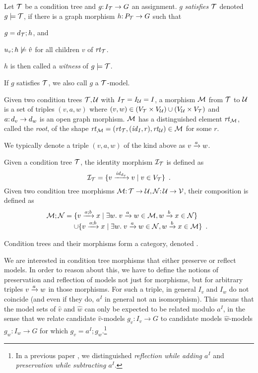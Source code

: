\begin{definition}[satisfaction]\label{def:satisfaction}
Let ${\mathcal{T}}$ be a condition tree and $g{:}\, I_{\mathcal{T}}\rightarrow G$ an assignment. $g$ \emph{satisfies ${\mathcal{T}}$} denoted $g\models {\mathcal{T}}$, if there is a graph morphism $h{:}\, P_{\mathcal{T}}\rightarrow G$ such that
\begin{inumerate}
\item $g=d_{\mathcal{T}};h$, and 
\item $u_v;h\not\models \hat v$ for all children $v$ of $\mathit{rt}_{{\mathcal{T}}}$.
\end{inumerate}
$h$ is then called a \emph{witness} of $g\models {\mathcal{T}}$.
\end{definition}
%
If $g$ satisfies ${\mathcal{T}}$, we also call $g$ a ${\mathcal{T}}$-model.


\begin{definition}[morphism]
Given two condition trees ${\mathcal{T}},{\mathcal{U}}$ with $I_{\mathcal{T}}=I_{\mathcal{U}}=I$, a morphism ${\mathcal{M}}$ from ${\mathcal{T}}$ to ${\mathcal{U}}$ is a set of triples $(v,a,w)$ where $(v,w)\in (V_{\mathcal{T}}\times V_{\mathcal{U}})\cup (V_{\mathcal{U}}\times V_{\mathcal{T}})$ and $a{:}\, d_v\rightarrow d_w$ is an open graph morphism. ${\mathcal{M}}$ has a distinguished element $\mathit{rt}_{{\mathcal{M}}}$, called the \emph{root}, of the shape $\mathit{rt}_{{\mathcal{M}}}=(\mathit{rt}_{{\mathcal{T}}},({\mathit{id}}_I,r),\mathit{rt}_{{\mathcal{U}}})\in {\mathcal{M}}$ for some $r$.
\end{definition}
%
We typically denote a triple $(v,a,w)$ of the kind above as $v\xrightarrow{a} w$.

Given a condition tree ${\mathcal{T}}$, the identity morphism ${\mathcal{I}}_{\mathcal{T}}$ is defined as
\[ {\mathcal{I}}_{\mathcal{T}} = \{{{v}\xrightarrow{{\mathit{id}}_{d_v}}{v} \mid v\in V_{\mathcal{T}}}\} \enspace. \]
Given two condition tree morphisms ${\mathcal{M}}{:}\, {\mathcal{T}}\rightarrow {\mathcal{U}},{\mathcal{N}}{:}\, {\mathcal{U}}\rightarrow {\mathcal{V}}$, their composition is defined as
\[ \cM;\cN =
\begin{array}[t]{@{}l}
	\setof{\trip v{a;b}x \mid \exists w\st \trip v a w\in\cM, \trip wbx\in \cN} \\
	\cup \setof{\trip v{a;b}x \mid \exists w\st \trip vaw\in\cN, \trip wbx\in\cM} \enspace.
\end{array}
\]

\begin{proposition}
Condition trees and their morphisms form a category, denoted {\CT}.
\end{proposition}
%
We are interested in condition tree morphisms that either preserve or reflect models. In order to reason about this, we have to define the notions of preservation and reflection of models not just for morphisms, but for arbitrary triples ${v}\xrightarrow{a}{w}$ in those morphisms. For such a triple, in general $I_v$ and $I_w$ do not coincide (and even if they do, $a^I$ in general not an isomorphism). This means that the model sets of $\hat v$ and $\hat w$ can only be expected to be related modulo $a^I$, in the sense that we relate candidate $\hat v$-models $g_v:I_v\to G$ to candidate models $\hat w$-models $g_w:I_w\to G$ for which $g_v=a^I;g_w$.\footnote{In a previous paper \cite{RensCorr}, we distinguished \emph{reflection while adding $a^I$} and \emph{preservation while subtracting $a^I$}.}

